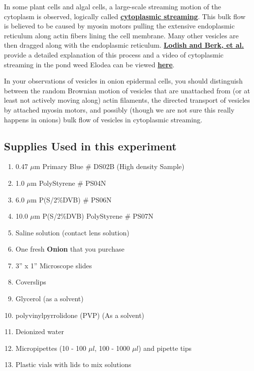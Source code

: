 \documentclass{../lab}
\begin{document}
In some plant cells and algal cells, a large-scale streaming motion of the cytoplasm is observed, logically called \href{http://physics111.lib.berkeley.edu/Physics111/Reprints/OTZ/biowikipedia.pdf}{\textbf{cytoplasmic streaming}}. This bulk flow is believed to be caused by myosin motors pulling the extensive endoplasmic reticulum along actin fibers lining the cell membrane. Many other vesicles are then dragged along with the endoplasmic reticulum. \href{http://www.ncbi.nlm.nih.gov/books/bv.fcgi?rid=mcb.figgrp.5242}{\textbf{Lodish and Berk, et al.}} provide a detailed explanation of this process and a video of cytoplasmic streaming in the pond weed Elodea can be viewed \href{http://www.microscopy-uk.org.uk/mag/imgnov00/cycloa3i.avi}{\textbf{here}}.

In your observations of vesicles in onion epidermal cells, you should distinguish between the random Brownian motion of vesicles that are unattached from (or at least not actively moving along) actin filaments, the directed transport of vesicles by attached myosin motors, and possibly (though we are not sure this really happens in onions) bulk flow of vesicles in cytoplasmic streaming.

\subsection{Supplies Used in this experiment}

\begin{enumerate}
    \item 0.47 $\mu$m Primary Blue \# DS02B (High density Sample)

    \item 1.0 $\mu$m PolyStyrene \# PS04N

    \item 6.0 $\mu$m P(S/2\%DVB) \# PS06N

    \item 10.0 $\mu$m P(S/2\%DVB) PolyStyrene \# PS07N

    \item Saline solution (contact lens solution)

    \item One fresh\textbf{ Onion} that you purchase

    \item 3'' x 1'' Microscope slides

    \item Coverslips

    \item Glycerol (as a solvent)

    \item polyvinylpyrrolidone (PVP) (As a solvent)

    \item Deionized water

    \item Micropipettes (10 - 100 $\mu l$, 100 - 1000 $\mu l$) and pipette tips

    \item Plastic vials with lids to mix solutions

\end{enumerate}
\end{document}
